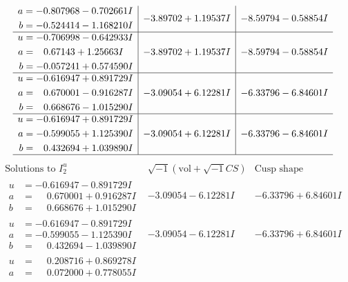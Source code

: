 \documentclass[1p]{elsarticle_modified}
\theoremstyle{definition}
\newcommand{\I}{\sqrt{-1}}
\begin{document}
$$\begin{array}{c|c|c}
\begin{aligned}
a &= -0.807968 - 0.702661 I \\
b &= -0.524414 - 1.168210 I\end{aligned}
 & -3.89702 + 1.19537 I & -8.59794 - 0.58854 I \\ \hline\begin{aligned}
u &= -0.706998 - 0.642933 I \\
a &= \phantom{-}0.67143 + 1.25663 I \\
b &= -0.057241 + 0.574590 I\end{aligned}
 & -3.89702 + 1.19537 I & -8.59794 - 0.58854 I \\ \hline\begin{aligned}
u &= -0.616947 + 0.891729 I \\
a &= \phantom{-}0.670001 - 0.916287 I \\
b &= \phantom{-}0.668676 - 1.015290 I\end{aligned}
 & -3.09054 + 6.12281 I & -6.33796 - 6.84601 I \\ \hline\begin{aligned}
u &= -0.616947 + 0.891729 I \\
a &= -0.599055 + 1.125390 I \\
b &= \phantom{-}0.432694 + 1.039890 I\end{aligned}
 & -3.09054 + 6.12281 I & -6.33796 - 6.84601 I\\
 \hline 
 \end{array}$$\newpage$$\begin{array}{c|c|c}  
\text{Solutions to }I^u_{2}& \I (\text{vol} + \sqrt{-1}CS) & \text{Cusp shape}\\
 \hline 
\begin{aligned}
u &= -0.616947 - 0.891729 I \\
a &= \phantom{-}0.670001 + 0.916287 I \\
b &= \phantom{-}0.668676 + 1.015290 I\end{aligned}
 & -3.09054 - 6.12281 I & -6.33796 + 6.84601 I \\ \hline\begin{aligned}
u &= -0.616947 - 0.891729 I \\
a &= -0.599055 - 1.125390 I \\
b &= \phantom{-}0.432694 - 1.039890 I\end{aligned}
 & -3.09054 - 6.12281 I & -6.33796 + 6.84601 I \\ \hline\begin{aligned}
u &= \phantom{-}0.208716 + 0.869278 I \\
a &= \phantom{-}0.072000 + 0.778055 I \\

\end{aligned}
\end{array}$$
\end{document}
